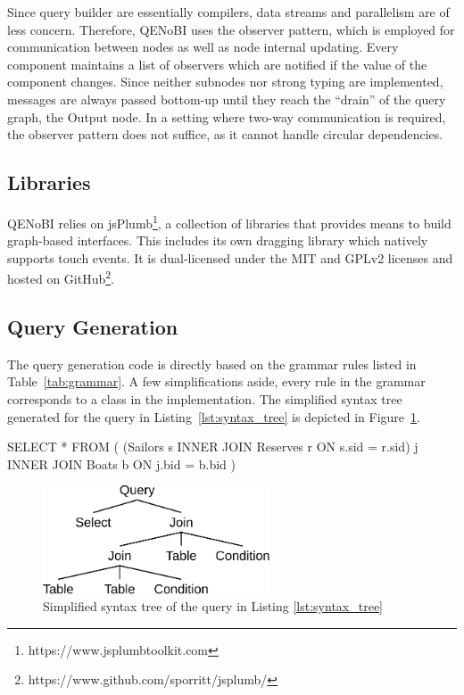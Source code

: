 \documentclass[11pt,a4paper]{globis-book}
\begin{document}
Since query builder are essentially compilers, data streams and parallelism are of less concern. Therefore, QENoBI uses the observer pattern, which is employed for communication between nodes as well as node internal updating. Every component maintains a list of observers which are notified if the value of the component changes. Since neither subnodes nor strong typing are implemented, messages are always passed bottom-up until they reach the ``drain'' of the query graph, the Output node. In a setting where two-way communication is required, the observer pattern does not suffice, as it cannot handle circular dependencies.

\subsection{Libraries}
QENoBI relies on jsPlumb\footnote{https://www.jsplumbtoolkit.com}, a collection of libraries that provides means to build graph-based interfaces. This includes its own dragging library which natively supports touch events. It is dual-licensed under the MIT and GPLv2 licenses and hosted on GitHub\footnote{https://www.github.com/sporritt/jsplumb/}.

\subsection{Query Generation}
The query generation code is directly based on the grammar rules listed in Table~\ref{tab:grammar}. A few simplifications aside, every rule in the grammar corresponds to a class in the implementation. The simplified syntax tree generated for the query in Listing~\ref{lst:syntax_tree} is depicted in Figure~\ref{fig:syntax_tree}.

\begin{codeex}[caption=Example query that produces the syntax tree in Figure \ref{fig:syntax_tree}, label=lst:syntax_tree]
SELECT *
FROM (
    (Sailors s INNER JOIN Reserves r ON s.sid = r.sid) j
    INNER JOIN Boats b
    ON j.bid = b.bid
  )
\end{codeex}

\begin{figure}[h]
  \centering
  \includegraphics[width=0.6\textwidth]{resources/SyntaxTree.pdf}
  \caption{Simplified syntax tree of the query in Listing \ref{lst:syntax_tree}}
  \label{fig:syntax_tree}
\end{figure}
\end{document}
